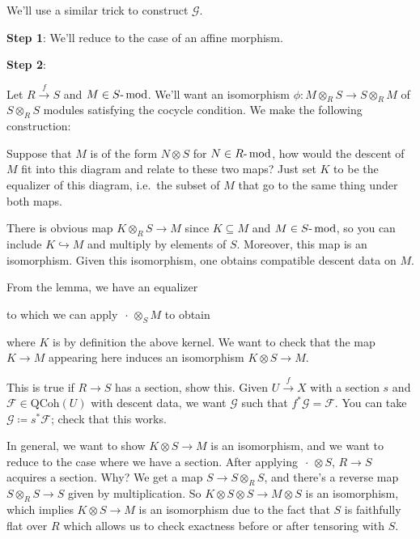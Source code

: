 We'll use a similar trick to construct \(\mathcal{G}\).

\begin{exercise}[Important]

\textbf{Step 1}: We'll reduce to the case of an affine morphism.

\end{exercise}

\textbf{Step 2}:

Let \(R\xrightarrow{f} S\) and
\(M\in {{S}{\hbox{-}}\operatorname{mod}}\). We'll want an isomorphism
\(\phi: M\otimes_R S\to S\otimes_R M\) of \(S\otimes_R S\) modules
satisfying the cocycle condition. We make the following construction:

Suppose that \(M\) is of the form \(N\otimes S\) for
\(N\in {R{\hbox{-}}\operatorname{mod}}\), how would the descent of \(M\)
fit into this diagram and relate to these two maps? Just set \(K\) to be
the equalizer of this diagram, i.e.~the subset of \(M\) that go to the
same thing under both maps.

\begin{claim}

There is obvious map \(K\otimes_R S\to M\) since \(K \subseteq M\) and
\(M\in {{S}{\hbox{-}}\operatorname{mod}}\), so you can include
\(K\hookrightarrow M\) and multiply by elements of \(S\). Moreover, this
map is an isomorphism. Given this isomorphism, one obtains compatible
descent data on \(M\).

\end{claim}

From the lemma, we have an equalizer

to which we can apply \({\,\cdot\,}\otimes_S M\) to obtain

where \(K\) is by definition the above kernel. We want to check that the
map \(K\to M\) appearing here induces an isomorphism
\(K\otimes S \to M\).

\begin{exercise}[Important]

This is true if \(R\to S\) has a section, show this. Given
\(U\xrightarrow{f} X\) with a section \(s\) and
\(\mathcal{F}\in {\mathrm{QCoh}}(U)\) with descent data, we want
\(\mathcal{G}\) such that \(f^* \mathcal{G} = \mathcal{F}\). You can
take \(\mathcal{G}\coloneqq s^* \mathcal{F}\); check that this works.

\end{exercise}

In general, we want to show \(K\otimes S \to M\) is an isomorphism, and
we want to reduce to the case where we have a section. After applying
\({\,\cdot\,}\otimes S\), \(R\to S\) acquires a section. Why? We get a
map \(S\to S\otimes_R S\), and there's a reverse map
\(S\otimes_R S\to S\) given by multiplication. So
\(K\otimes S \otimes S \to M\otimes S\) is an isomorphism, which implies
\(K\otimes S\to M\) is an isomorphism due to the fact that \(S\) is
faithfully flat over \(R\) which allows us to check exactness before or
after tensoring with \(S\).

